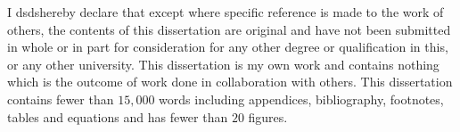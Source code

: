 
\begin{declaration}

I dsdshereby declare that except where specific reference is made to the work of 
others, the contents of this dissertation are original and have not been 
submitted in whole or in part for consideration for any other degree or 
qualification in this, or any other university. This dissertation is my own 
work and contains nothing which is the outcome of work done in collaboration 
with others. This dissertation contains fewer than $15,000$ words including appendices, 
bibliography, footnotes, tables and equations and has fewer than  $20$ figures.

\vspace{5em}



\end{declaration}

